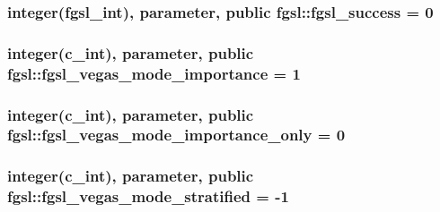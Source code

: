 \subsubsection[{fgsl\+\_\+success}]{\setlength{\rightskip}{0pt plus 5cm}integer({\bf fgsl\+\_\+int}), parameter, public fgsl\+::fgsl\+\_\+success = 0}\label{namespacefgsl_a5637d95a4aceec9a80a9b74a2e40ebdf}
\hypertarget{namespacefgsl_a40718f473b729ccccca99b83b15569f1}{}
\subsubsection[{fgsl\+\_\+vegas\+\_\+mode\+\_\+importance}]{\setlength{\rightskip}{0pt plus 5cm}integer(c\+\_\+int), parameter, public fgsl\+::fgsl\+\_\+vegas\+\_\+mode\+\_\+importance = 1}\label{namespacefgsl_a40718f473b729ccccca99b83b15569f1}
\hypertarget{namespacefgsl_a8b3b603c4ff1fa9726169eaeb1617cf4}{}
\subsubsection[{fgsl\+\_\+vegas\+\_\+mode\+\_\+importance\+\_\+only}]{\setlength{\rightskip}{0pt plus 5cm}integer(c\+\_\+int), parameter, public fgsl\+::fgsl\+\_\+vegas\+\_\+mode\+\_\+importance\+\_\+only = 0}\label{namespacefgsl_a8b3b603c4ff1fa9726169eaeb1617cf4}
\hypertarget{namespacefgsl_a03809231ad730f80ecda79c11940298e}{}
\subsubsection[{fgsl\+\_\+vegas\+\_\+mode\+\_\+stratified}]{\setlength{\rightskip}{0pt plus 5cm}integer(c\+\_\+int), parameter, public fgsl\+::fgsl\+\_\+vegas\+\_\+mode\+\_\+stratified = -\/1}\label{namespacefgsl_a03809231ad730f80ecda79c11940298e}
\hypertarget{namespacefgsl_a3443bae7bac02745f1562e6c2f891656}{}
